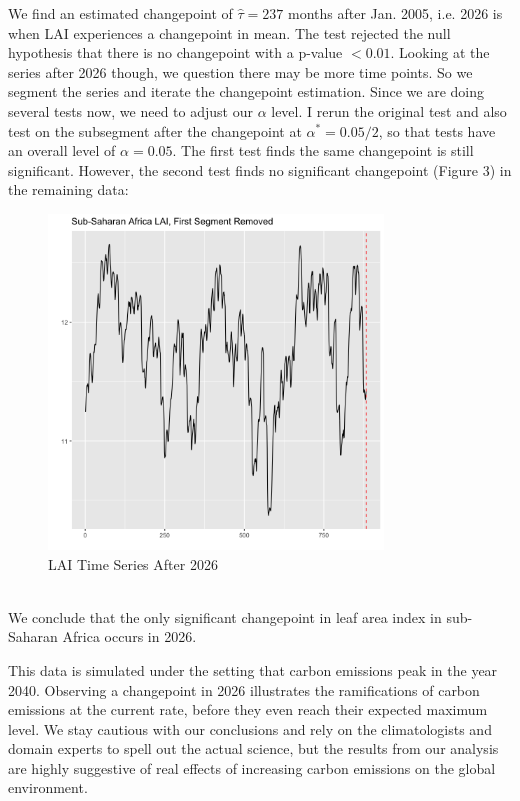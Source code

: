 \documentclass[11pt]{article}
\begin{document}
We find an estimated changepoint of $\hat{\tau}= 237$ months after Jan. 2005, i.e. 2026 is when LAI experiences a changepoint in mean. The test rejected the null hypothesis that there is no changepoint with a p-value $<0.01$. Looking at the series after 2026 though, we question there may be more time points. So we segment the series and iterate the changepoint estimation. Since we are doing several tests now, we need to adjust our $\alpha$ level. I rerun the original test and also test on the subsegment after the changepoint at $\alpha^*=0.05/2$, so that tests have an overall level of $\alpha=0.05$. The first test finds the same changepoint is still significant. However, the second test finds no significant changepoint (Figure 3)  in the remaining data:
\begin{figure}[h!]
	\centering
	\includegraphics[width=3.5in, height=3.5in]{../img/changepoint_LAI_seg.png}
	\caption{LAI Time Series After 2026}
\end{figure}\\
We conclude that the only significant changepoint in leaf area index in sub-Saharan Africa occurs in 2026. 
\par This data is simulated under the setting that carbon emissions peak in the year 2040. Observing a changepoint in 2026 illustrates the ramifications of carbon emissions at the current rate, before they even reach their expected maximum level. We stay cautious with our conclusions and rely on the climatologists and domain experts to spell out the actual science, but the results from our analysis are highly suggestive of real effects of increasing carbon emissions on the global environment.
\end{document}
